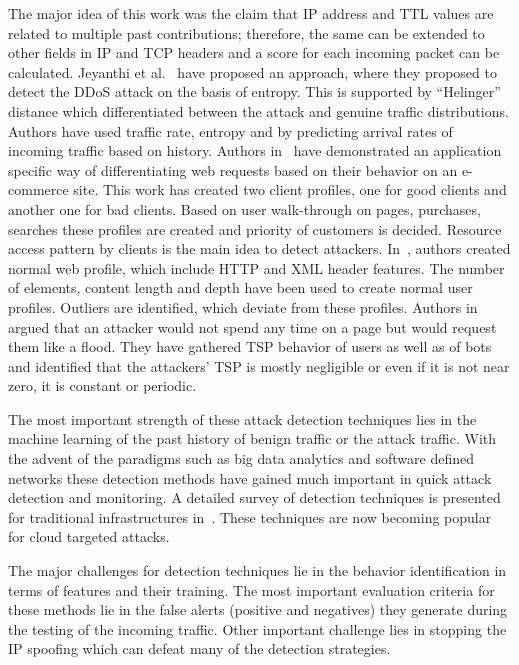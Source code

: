 \documentclass[final,5p,times,twocolumn]{elsarticle}
\begin{document}
\noindent The major idea of this work was the claim that IP address and TTL values are related to multiple past contributions; therefore, the same can be extended to other fields in IP and TCP headers and a score for each incoming packet can be calculated. Jeyanthi et al.~\cite{jeyanthi} have proposed an approach, where they proposed to detect the DDoS attack on the basis of entropy. This is supported by ``Helinger'' distance which differentiated between the attack and genuine traffic distributions. Authors have used traffic rate, entropy and by predicting arrival rates of incoming traffic based on history. Authors in~\cite{edosarmor} have demonstrated an application specific way of differentiating web requests based on their behavior on an e-commerce site. This work has created two client profiles, one for good clients and another one for bad clients. Based on user walk-through on pages, purchases, searches these profiles are created and priority of customers is decided. Resource access pattern by clients is the main idea to detect attackers. In~\cite{ddosdefense}, authors created normal web profile, which include HTTP and XML header features. The number of elements, content length and depth have been used to create normal user profiles. Outliers are identified, which deviate from these profiles. Authors in~\cite{timespent} argued that an attacker would not spend any time on a page but would request them like a flood. They have gathered TSP behavior of users as well as of bots and identified that the attackers’ TSP is mostly negligible or even if it is not near zero, it is constant or periodic.

{The most important strength of these attack detection techniques lies in the machine learning of the past history of benign traffic or the attack traffic. With the advent of the paradigms such as big data analytics and software defined networks these detection methods have gained much important in quick attack detection and monitoring. A detailed survey of detection techniques is presented for traditional infrastructures in~\cite{Mirk}. These techniques are now becoming popular for cloud targeted attacks. }

{The major challenges for detection techniques lie in the behavior identification in terms of features and their training. The most important evaluation criteria for these methods lie in the false alerts (positive and negatives)  they generate during the testing of the incoming traffic. Other important challenge lies in stopping the IP spoofing which can defeat many of the detection strategies. }
\end{document}
